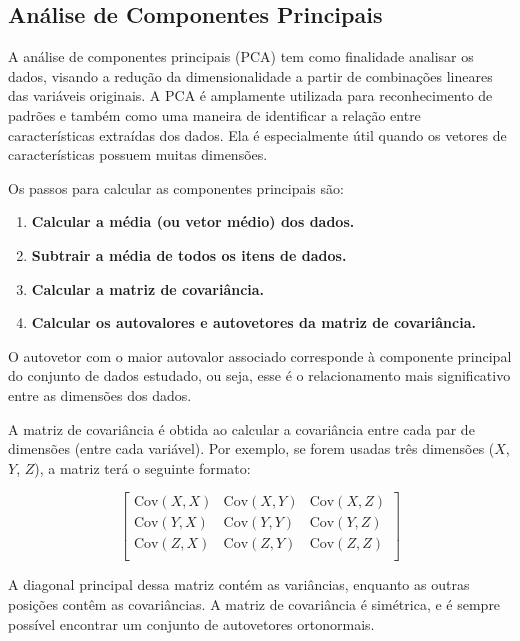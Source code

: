 \documentclass[
  portuguese,
]{estat/estat}
\providecommand{\tightlist}{%
  \setlength{\itemsep}{0pt}\setlength{\parskip}{0pt}}
\begin{document}
\subsection{Análise de Componentes
Principais}\label{anuxe1lise-de-componentes-principais}

A análise de componentes principais (PCA) tem como finalidade analisar
os dados, visando a redução da dimensionalidade a partir de combinações
lineares das variáveis originais. A PCA é amplamente utilizada para
reconhecimento de padrões e também como uma maneira de identificar a
relação entre características extraídas dos dados. Ela é especialmente
útil quando os vetores de características possuem muitas dimensões.

Os passos para calcular as componentes principais são:

\begin{enumerate}
\def\labelenumi{\arabic{enumi}.}
\tightlist
\item
  \textbf{Calcular a média (ou vetor médio) dos dados.}
\item
  \textbf{Subtrair a média de todos os itens de dados.}
\item
  \textbf{Calcular a matriz de covariância.}
\item
  \textbf{Calcular os autovalores e autovetores da matriz de
  covariância.}
\end{enumerate}

O autovetor com o maior autovalor associado corresponde à componente
principal do conjunto de dados estudado, ou seja, esse é o
relacionamento mais significativo entre as dimensões dos dados.

A matriz de covariância é obtida ao calcular a covariância entre cada
par de dimensões (entre cada variável). Por exemplo, se forem usadas
três dimensões (\(X\), \(Y\), \(Z\)), a matriz terá o seguinte formato:

\[
\begin{bmatrix}
    \text{Cov}(X,X) & \text{Cov}(X,Y) & \text{Cov}(X,Z) \\
    \text{Cov}(Y,X) & \text{Cov}(Y,Y) & \text{Cov}(Y,Z) \\
    \text{Cov}(Z,X) & \text{Cov}(Z,Y) & \text{Cov}(Z,Z) \\
\end{bmatrix}
\]

A diagonal principal dessa matriz contém as variâncias, enquanto as
outras posições contêm as covariâncias. A matriz de covariância é
simétrica, e é sempre possível encontrar um conjunto de autovetores
ortonormais.
\end{document}
